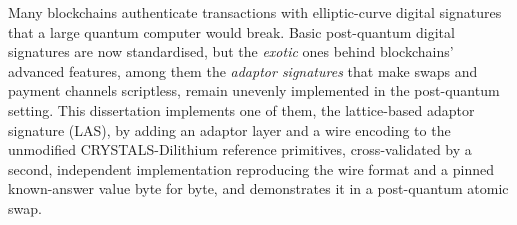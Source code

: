 %
%

Many blockchains authenticate transactions with elliptic-curve digital signatures that a large quantum
computer would break. Basic post-quantum digital signatures are now standardised, but the
\emph{exotic} ones behind blockchains' advanced features, among them the \emph{adaptor
signatures} that make swaps and payment channels scriptless, remain unevenly implemented
in the post-quantum setting. This dissertation implements one of them, the lattice-based
adaptor signature (LAS), by adding an adaptor layer and a wire encoding to the unmodified CRYSTALS-Dilithium reference
primitives, cross-validated by a second, independent implementation reproducing the wire
format and a pinned known-answer value byte for byte, and demonstrates it in a
post-quantum atomic swap.

